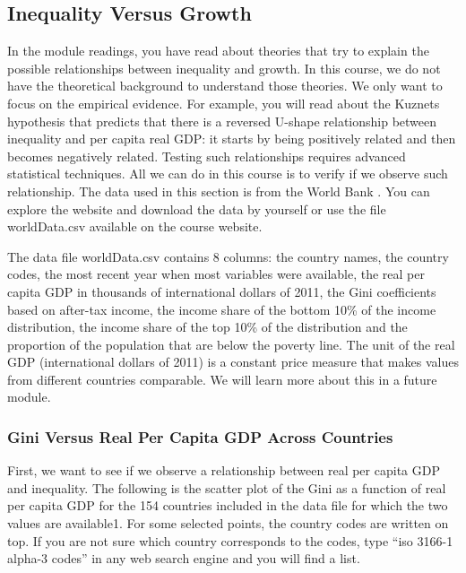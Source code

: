 \documentclass[letterpaper]{article}\usepackage[]{graphicx}\usepackage[]{color}
\numberwithin{exer}{section}
\theoremstyle{nonumberplain}
\begin{document}
\subsection{Inequality Versus Growth}


In the module readings, you have read about theories that try to
explain the possible relationships between inequality and growth. In
this course, we do not have the theoretical background to understand
those theories. We only want to focus on the empirical evidence. For
example, you will read about the Kuznets hypothesis that predicts that
there is a reversed U-shape relationship between inequality and per
capita real GDP: it starts by being positively related and then
becomes negatively related. Testing such relationships requires
advanced statistical techniques. All we can do in this course is to
verify if we observe such relationship. The data used in this section
is from the World Bank \citep*{gdp-gini-wb}. You can explore the
website and download the data by yourself or use the file
worldData.csv available on the course website.

The data file worldData.csv contains 8 columns: the country names, the
country codes, the most recent year when most variables were
available, the real per capita GDP in thousands of international
dollars of 2011, the Gini coefficients based on after-tax income, the
income share of the bottom 10\% of the income distribution, the income
share of the top 10\% of the distribution and the proportion of the
population that are below the poverty line. The unit of the real GDP
(international dollars of 2011) is a constant price measure that makes
values from different countries comparable. We will learn more about
this in a future  module.

\subsubsection*{Gini Versus Real Per Capita GDP Across Countries}

First, we want to see if we observe a relationship between real per
capita GDP and inequality. The following is the scatter plot of the
Gini as a function of real per capita GDP for the 154 countries
included in the data file for which the two values are available1. For
some selected points, the country codes are written on top.  If you
are not sure which country corresponds to the codes, type ``iso 3166-1
alpha-3 codes'' in any web search engine and you will find a list.
\end{document}
